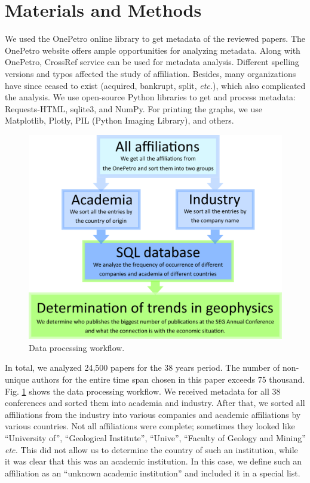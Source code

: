\documentclass[energies,article,submit,moreauthors,pdftex]{Definitions/mdpi}
\begin{document}
\section{Materials and Methods}

We used the OnePetro online library \citep{SPE2019} to get metadata of the reviewed papers. The OnePetro website offers ample opportunities for analyzing metadata. Along with OnePetro, CrossRef service can be used for metadata analysis. Different spelling versions and typos affected the study of affiliation. Besides, many organizations have since ceased to exist (acquired, bankrupt, split, \textit{etc.}), which also complicated the analysis. We use open-source Python libraries to get and process metadata: Requests-HTML, sqlite3, and NumPy. For printing the graphs, we use Matplotlib, Plotly, PIL (Python Imaging Library), and others.


\begin{figure}[ht!]
\centering
\includegraphics[scale=1]{scheme_meta.png}
\caption{Data processing workflow.}
\label{scheme_workflow}
\end{figure}


In total, we analyzed 24,500 papers for the 38 years period. The number of non-unique authors for the entire time span chosen in this paper exceeds 75 thousand. Fig. \ref{scheme_workflow} shows the data processing workflow. We received metadata for all 38 conferences and sorted them into academia and industry. After that, we sorted all affiliations from the industry into various companies and academic affiliations by various countries. Not all affiliations were complete; sometimes they looked like ``University of'', ``Geological Institute'', ``Unive'', ``Faculty of Geology and Mining'' \textit{etc.} This did not allow us to determine the country of such an institution, while it was clear that this was an academic institution. In this case, we define such an affiliation as an ``unknown academic institution'' and included it in a special list. 
\end{document}
